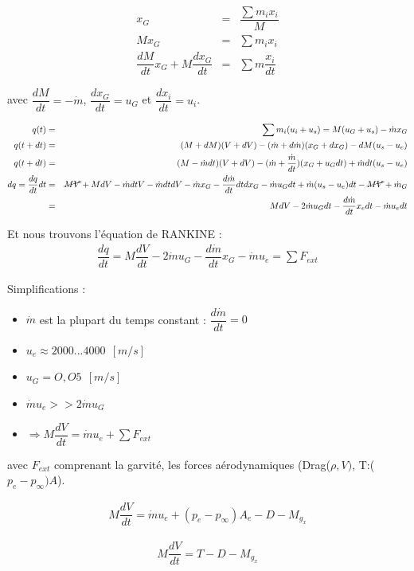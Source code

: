 \documentclass{report}
\begin{document}
\begin{eqnarray}
x_G &= &\dfrac{\sum m_i x_i}{M}\\
M x_G &= &\sum m_i x_i\\
\dfrac{dM}{dt}x_G + M\dfrac{dx_G}{dt} &= &\sum m\dfrac{x_i}{dt}
\end{eqnarray}

avec $\dfrac{dM}{dt} = -\dot{m}$, $\dfrac{dx_G}{dt} = u_G$ et $\dfrac{dx_i}{dt} = u_i$.

\begin{eqnarray}
q(t) &= &\sum m_i(u_i+u_s) = M(u_G+u_s)-\dot{m}x_G\\
q(t+dt) &= &(M+dM)(V+dV)-(\dot{m}+d\dot{m})(x_G+dx_G)-dM(u_s-u_e)\\
q(t+dt) &= &(M-\dot{m}dt)(V+dV)-(\dot{m}+\dfrac{\dot{m}}{dt})(x_G+u_Gdt)+\dot{m}dt(u_s-u_e)\\
dq =\dfrac{dq}{dt}dt &= & \cancel{MV}+MdV-\dot{m}dtV-\dot{m}dt dV - \dot{m}x_G -\dfrac{d\dot{m}}{dt}dtdx_G-\dot{m}u_G dt + \dot{m}(u_s-u_e)dt -\cancel{MV}+\dot{m}_G\\
 &= &MdV-2\dot{m}u_Gdt-\dfrac{d\dot{m}}{dt}x_e dt-\dot{m}u_e dt
\end{eqnarray}

Et nous trouvons l'équation de RANKINE :
\begin{eqnarray}
\boxed{\dfrac{dq}{dt}=M\dfrac{dV}{dt}-2\dot{m}u_G-\dfrac{d\dot{m}}{dt}x_G-\dot{m}u_e=\sum F_{ext}}
\end{eqnarray}

Simplifications :\\
\begin{itemize}
    \item $\dot{m}$ est la plupart du temps constant : $\dfrac{d\dot{m}}{dt}=0$
    \item $u_e \approx 2000...4000~~[m/s]$
    \item $u_G=O,O5~~[m/s]$
    \item $\dot{m}u_e >> 2\dot{m}u_G$
    \item $\Rightarrow \boxed{M\dfrac{dV}{dt}=\dot{m}u_e+\sum F_{ext}}$
\end{itemize}

avec $F_{ext}$ comprenant la garvité, les forces aérodynamiques (Drag($\rho,V)$, T:($p_e-p_\infty)A$).

\begin{eqnarray}
M\dfrac{dV}{dt}=\dot{m}u_e + (p_e-p_\infty) A_e - D-M_{g_x}
\end{eqnarray}

\begin{eqnarray}
\boxed{M\dfrac{dV}{dt}=T-D-M_{g_x}}
\end{eqnarray}
\end{document}
